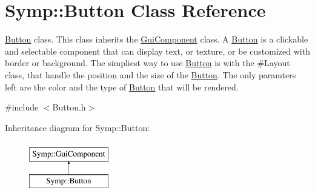 \hypertarget{class_symp_1_1_button}{\section{Symp\-:\-:Button Class Reference}
\label{class_symp_1_1_button}
}


\hyperlink{class_symp_1_1_button}{Button} class. This class inherits the \hyperlink{class_symp_1_1_gui_component_a22124675c2976983ac18374f81cc3fb3}{Gui\-Component} class. A \hyperlink{class_symp_1_1_button_a2de1604451d582a7c2e22344305212e5}{Button} is a clickable and selectable component that can display text, or texture, or be customized with border or background. The simpliest way to use \hyperlink{class_symp_1_1_button_a2de1604451d582a7c2e22344305212e5}{Button} is with the \#\-Layout class, that handle the position and the size of the \hyperlink{class_symp_1_1_button_a2de1604451d582a7c2e22344305212e5}{Button}. The only paramters left are the color and the type of \hyperlink{class_symp_1_1_button_a2de1604451d582a7c2e22344305212e5}{Button} that will be rendered.  




{\ttfamily \#include $<$Button.\-h$>$}

Inheritance diagram for Symp\-:\-:Button\-:\begin{figure}[H]
\begin{center}
\leavevmode
\includegraphics[height=2.000000cm]{class_symp_1_1_button}
\end{center}
\end{figure}
